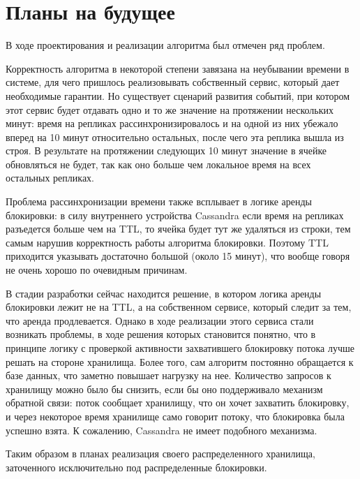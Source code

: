\section{Планы на будущее}

В ходе проектирования и реализации алгоритма был отмечен ряд проблем.

Корректность алгоритма в некоторой степени завязана на неубывании времени в системе, для чего пришлось реализовывать собственный сервис, который дает необходимые гарантии. Но существует сценарий развития событий, при котором этот сервис будет отдавать одно и то же значение на протяжении нескольких минут: время на репликах рассинхронизировалось и на одной из них убежало вперед на 10 минут относительно остальных, после чего эта реплика вышла из строя. В результате на протяжении следующих 10 минут значение в ячейке обновляться не будет, так как оно больше чем локальное время на всех остальных репликах.

Проблема рассинхронизации времени также всплывает в логике аренды блокировки: в силу внутреннего устройства Cassandra если время на репликах разъедется больше чем на TTL, то ячейка будет тут же удаляться из строки, тем самым нарушив корректность работы алгоритма блокировки. Поэтому TTL приходится указывать достаточно большой (около 15 минут), что вообще говоря не очень хорошо по очевидным причинам.

В стадии разработки сейчас находится решение, в котором логика аренды блокировки лежит не на TTL, а на собственном сервисе, который следит за тем, что аренда продлевается. Однако в ходе реализации этого сервиса стали возникать проблемы, в ходе решения которых становится понятно, что в принципе логику с проверкой активности захватившего блокировку потока лучше решать на стороне хранилища. Более того, сам алгоритм постоянно обращается к базе данных, что заметно повышает нагрузку на нее. Количество запросов к хранилищу можно было бы снизить, если бы оно поддерживало механизм обратной связи: поток сообщает хранилищу, что он хочет захватить блокировку, и через некоторое время хранилище само говорит потоку, что блокировка была успешно взята. К сожалению, Cassandra не имеет подобного механизма.

Таким образом в планах реализация своего распределенного хранилища, заточенного исключительно под распределенные блокировки.
